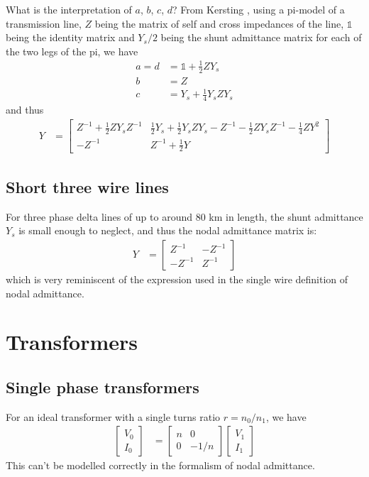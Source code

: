 \documentclass[11pt]{article}
\newcommand{\Id}{\mathds{1}}
\begin{document}
What is the interpretation of $a$, $b$, $c$, $d$? From Kersting \cite{KerstingXXXXa}, using a pi-model of a transmission line, $Z$ being the matrix of self and cross impedances of the line, $\Id$ being the identity matrix and $Y_s/2$ being the shunt admittance matrix for each of the two legs of the pi, we have
\begin{align}
a = d &= \Id + \frac{1}{2}ZY_s \\
b &= Z \\
c &= Y_s + \frac{1}{4}Y_s Z Y_s
\end{align}
and thus
\begin{align}
Y &= \begin{bmatrix} Z^{-1} + \frac{1}{2}ZY_sZ^{-1} & \frac{1}{2}Y_s + \frac{1}{2}Y_sZY_s - Z^{-1}-\frac{1}{2}ZY_sZ^{-1}-\frac{1}{4}ZY^2 \\
-Z^{-1} & Z^{-1}+\frac{1}{2}Y \end{bmatrix} 
\end{align}
\subsection{Short three wire lines}
For three phase delta lines of up to around 80 km in length, the shunt admittance $Y_s$ is small enough to neglect, and thus the nodal admittance matrix is:
\begin{align}
	Y &=
	\begin{bmatrix} Z^{-1} & -Z^{-1} \\ -Z^{-1} & Z^{-1} \end{bmatrix}
\end{align}
which is very reminiscent of the expression used in the single wire definition of nodal admittance.
\section{Transformers}
\subsection{Single phase transformers}
For an ideal transformer with a single turns ratio $r = n_0/n_1$, we have
\begin{align}
\begin{bmatrix}V_0 \\ I_0\end{bmatrix} &= \begin{bmatrix}n & 0 \\ 0 & -1/n\end{bmatrix}\begin{bmatrix}V_1 \\ I_1 \end{bmatrix}
\end{align}
This can't be modelled correctly in the formalism of nodal admittance.
\end{document}
